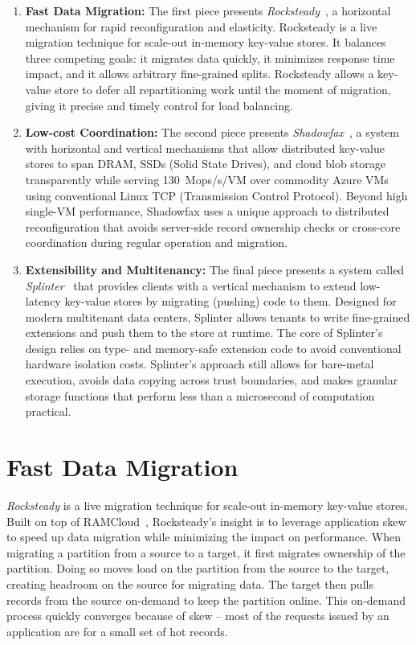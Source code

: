 \begin{enumerate}
\item \textbf{Fast Data Migration:}
The first piece presents \emph{Rocksteady}~\cite{rocksteady},
a horizontal mechanism for rapid reconfiguration and elasticity.
%
Rocksteady is a live migration technique for scale-out
in-memory key-value stores.
%
It balances three competing goals: it
migrates data quickly, it minimizes response time impact, and it
allows arbitrary fine-grained splits.
%
Rocksteady allows a key-value store to defer all repartitioning work
until the moment of migration, giving it precise and timely control for
load balancing.

\item \textbf{Low-cost Coordination:}
The second piece presents \emph{Shadowfax}~\cite{shadowfax},
a system with horizontal and vertical mechanisms that
allow distributed key-value stores to
span DRAM, SSDs (Solid State Drives), and cloud blob storage transparently while serving
130~Mops/s/VM over commodity Azure VMs using conventional Linux TCP
(Transmission Control Protocol).
%
Beyond
high single-VM performance, Shadowfax uses a unique approach to distributed
reconfiguration that avoids server-side record ownership checks
or cross-core coordination during regular operation and migration.

\item \textbf{Extensibility and Multitenancy:}
The final piece presents a system called \emph{Splinter}~\cite{splinter}
that
provides clients with a vertical mechanism
to extend low-latency key-value stores by migrating (pushing) code to them.
%
Designed for
modern multitenant data centers, Splinter allows
tenants to write
fine-grained extensions and push
them to the store at runtime.
%
The core of
Splinter's design relies on type- and memory-safe
extension code to avoid conventional hardware isolation costs.
%
Splinter's approach
still allows for bare-metal execution, avoids data copying across trust
boundaries, and makes granular storage functions that perform less than
a microsecond of computation practical.

\end{enumerate}

\section{Fast Data Migration}

\emph{Rocksteady} is a live migration technique for scale-out
in-memory key-value stores.
%
Built on top of RAMCloud~\cite{ramcloud}, Rocksteady’s insight is to
leverage application skew to speed up data migration while minimizing
the impact on performance.
%
When migrating a partition from a source to a target, it first migrates
ownership of the partition.
%
Doing so moves load on the partition from the source to the target, creating
headroom on the source for migrating data.
%
The target then pulls records from the source
on-demand to keep the partition online.
%
This on-demand process quickly converges because of skew –
most of the requests issued by an application are for a small set of hot
records.

